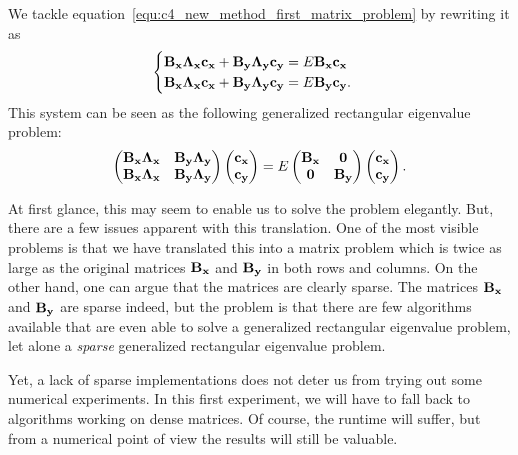 We tackle equation~\eqref{equ:c4_new_method_first_matrix_problem} by rewriting it as
$$
    \begin{cases}
        \vb{B_x} \vb{\Lambda_x}\vb{c_x} + \vb{B_y} \vb{\Lambda_y}\vb{c_y} = E \vb{B_x} \vb{c_x} \\
        \vb{B_x} \vb{\Lambda_x}\vb{c_x} + \vb{B_y} \vb{\Lambda_y}\vb{c_y} = E \vb{B_y} \vb{c_y}\text{.}
    \end{cases}
$$
This system can be seen as the following generalized rectangular eigenvalue problem:
\begin{equation}\label{equ:c4_new_method_alternative_system}
    \begin{pmatrix}
        \vb{B_x} \vb{\Lambda_x} & \vb{B_y} \vb{\Lambda_y} \\
        \vb{B_x} \vb{\Lambda_x} & \vb{B_y} \vb{\Lambda_y}
    \end{pmatrix} \begin{pmatrix}
        \vb{c_x} \\ \vb{c_y}
    \end{pmatrix} = E \begin{pmatrix}
        \vb{B_x} & \vb{0} \\ \vb{0} & \vb{B_y}
    \end{pmatrix} \begin{pmatrix}
        \vb{c_x} \\ \vb{c_y}
    \end{pmatrix}\text{.}
\end{equation}

At first glance, this may seem to enable us to solve the problem elegantly. But, there are a few issues apparent with this translation. One of the most visible problems is that we have translated this into a matrix problem which is twice as large as the original matrices $\vb{B_x}$ and $\vb{B_y}$ in both rows and columns. On the other hand, one can argue that the matrices are clearly sparse. The matrices $\vb{B_x}$ and $\vb{B_y}$ are sparse indeed, but the problem is that there are few algorithms available that are even able to solve a generalized rectangular eigenvalue problem, let alone a \emph{sparse} generalized rectangular eigenvalue problem.

Yet, a lack of sparse implementations does not deter us from trying out some numerical experiments. In this first experiment, we will have to fall back to algorithms working on dense matrices. Of course, the runtime will suffer, but from a numerical point of view the results will still be valuable.

